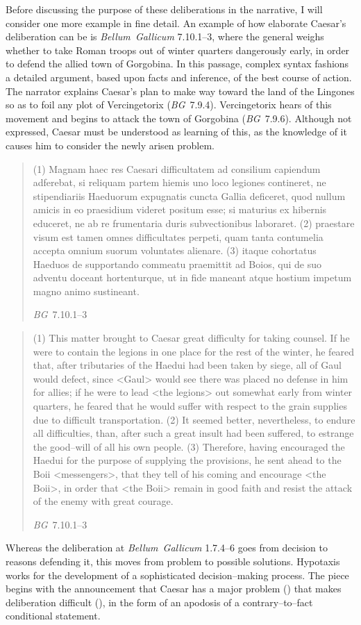 \documentclass[12pt,letterpaper,oneside,final]{memoir}
\begin{document}
Before discussing the purpose of these deliberations in the narrative, I will consider one more example in fine detail. An example of how elaborate Caesar's deliberation can be is \emph{Bellum~Gallicum} 7.10.1--3, where the general weighs whether to take Roman troops out of winter quarters dangerously early, in order to defend the allied town of Gorgobina. In this passage, complex syntax fashions a detailed argument, based upon facts and inference, of the best course of action. The narrator explains Caesar's plan to make way toward the land of the Lingones so as to foil any plot of Vercingetorix (\emph{BG}~7.9.4). Vercingetorix hears of this movement and begins to attack the town of Gorgobina (\emph{BG}~7.9.6). Although not expressed, Caesar must be understood as learning of this, as the knowledge of it causes him to consider the newly arisen problem. \blockquote[\emph{BG}~7.10.1--3]{(1) Magnam haec res Caesari difficultatem ad consilium capiendum adferebat, si reliquam partem hiemis uno loco legiones contineret, ne stipendiariis Haeduorum expugnatis cuncta Gallia deficeret, quod nullum amicis in eo praesidium videret positum esse; si maturius ex hibernis educeret, ne ab re frumentaria duris subvectionibus laboraret. (2) praestare visum est tamen omnes difficultates perpeti, quam tanta contumelia accepta omnium suorum voluntates alienare. (3) itaque cohortatus Haeduos de supportando commeatu praemittit ad Boios, qui de suo adventu doceant hortenturque, ut in fide maneant atque hostium impetum magno animo sustineant.} \blockquote[\emph{BG}~7.10.1--3]{(1) This matter brought to Caesar great difficulty for taking counsel. If he were to contain the legions in one place for the rest of the winter, he feared that, after tributaries of the Haedui had been taken by siege, all of Gaul would defect, since <Gaul> would see there was placed no defense in him for allies; if he were to lead <the legions> out somewhat early from winter quarters, he feared that he would suffer with respect to the grain supplies due to difficult transportation. (2) It seemed better, nevertheless, to endure  all difficulties, than, after such a great insult had been suffered, to estrange the good--will of all his own people. (3) Therefore, having encouraged the Haedui for the purpose of supplying the provisions, he sent ahead to the Boii <messengers>, that they tell of his coming and encourage <the Boii>, in order that <the Boii> remain in good faith and resist the attack of the enemy with great courage.} Whereas the deliberation at \emph{Bellum~Gallicum} 1.7.4--6 goes from decision to reasons defending it, this moves from problem to possible solutions. Hypotaxis works for the development of a sophisticated decision--making process. The piece begins with the announcement that Caesar has a major problem () that makes deliberation difficult (), in the form of an apodosis of a contrary--to--fact conditional statement. \begin{latin} \begin{enumerate} \SingleSpacing

\end{enumerate}
\end{latin}
\end{document}

